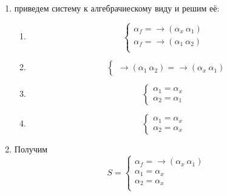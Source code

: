 \documentclass[12pt, a4paper]{article}
\begin{document}
	\begin{enumerate}
		\item приведем систему к алгебрачиескому виду и решим её:\par 
			\begin{enumerate}
			\item \[\begin{cases}
				\alpha_f=\rightarrow(\alpha_x\:\alpha_1)&\\
				\alpha_f=\rightarrow(\alpha_1\:\alpha_2)&\\
			\end{cases}\]
			\item \[
				\begin{cases}
				\rightarrow(\alpha_1\:\alpha_2)=\rightarrow(\alpha_x\:\alpha_1)
				\end{cases}\]
			\item \[
				\begin{cases}
				\alpha_1=\alpha_x&\\
				\alpha_2=\alpha_1
				\end{cases}\]
			\item \[
				\begin{cases}
				\alpha_1=\alpha_x&\\
				\alpha_2=\alpha_x
				\end{cases}\]
\end{enumerate}					
		\item  Получим \[S=\begin{cases}
						\alpha_f=\rightarrow(\alpha_x\:\alpha_1)&\\
						\alpha_1=\alpha_x&\\
						\alpha_2=\alpha_x&\\
				\end{cases}\]
	\end{enumerate}
	
\end{document}
